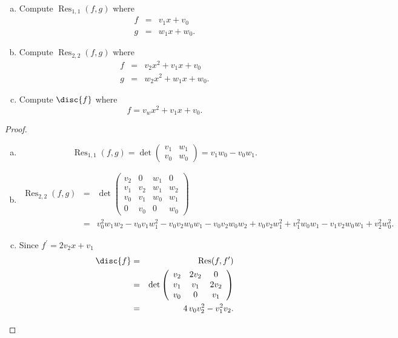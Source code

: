 \documentclass[10pt]{amsart}
\begin{document}
\begin{thm}
  \begin{enumerate}[(a)]
  \item
    Compute $\operatorname{Res}_{1,1}(f,g)$ where
    \begin{eqnarray*}
      f &=& v_1 x + v_0\\
      g &=& w_1x + w_0.
    \end{eqnarray*}
    \item
      Compute $\operatorname{Res}_{2,2}(f,g)$ where
      \begin{eqnarray*}
        f &=& v_2x^2 + v_1x + v_0\\
        g &=& w_2x^2 + w_1x + w_0.
      \end{eqnarray*}
    \item
      Compute $\disc{f}$ where
      $$f = v_wx^2 + v_1x + v_0.$$
  \end{enumerate}
  
  \begin{proof}
    \begin{enumerate}[(a)]
    \item
      $$\operatorname{Res}_{1,1}(f,g) = \det\left(\begin{array}{cc}
      v_1 & w_1\\
      v_0 & w_0
    \end{array}\right) = v_{1} w_{0} -v_{0} w_{1}.$$
    \item
      \begin{eqnarray*}
        \operatorname{Res}_{2,2}(f,g) &=& \det\left(\begin{array}{cccc}
      v_2 & 0 & w_1 & 0\\
      v_1 & v_2 & w_1 & w_2\\
      v_0 & v_1 & w_0 & w_1\\
      0 & v_0 & 0 & w_0
    \end{array}\right)\\
        &=& v_{0}^{2} w_{1} w_{2} - v_{0} v_{1} w_{1}^{2} - v_{0} v_{2} w_{0} w_{1}
        - v_{0} v_{2} w_{0} w_{2} + v_{0} v_{2} w_{1}^{2} + v_{1}^{2} w_{0}
        w_{1} - v_{1} v_{2} w_{0} w_{1} + v_{2}^{2} w_{0}^{2}.
      \end{eqnarray*}
    \item
      Since $f^\prime = 2v_2x + v_1$
      \begin{eqnarray*}
        \disc{f} &=& \operatorname{Res}(f,f^\prime)\\
        &=& \det \left(\begin{array}{ccc}
        v_2 & 2v_2 & 0\\
        v_1 & v_1 & 2v_2\\
        v_0 & 0 & v_1
      \end{array}\right)\\
        &=& 4 \, v_{0} v_{2}^{2} - v_{1}^{2} v_{2}.
      \end{eqnarray*}
    \end{enumerate}
  \end{proof}
\end{thm}
\end{document}

